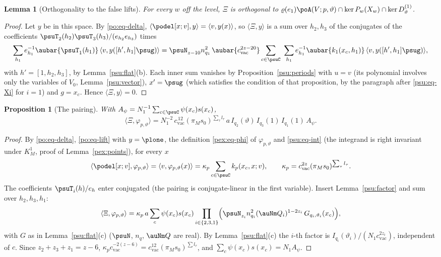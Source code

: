 \documentclass[10pt]{amsart}
\newtheorem{proposition}[theorem]{Proposition}
\newtheorem{lemma}[theorem]{Lemma}
\theoremstyle{definition}
\theoremstyle{remark}
\begin{document}
\begin{lemma}[Orthogonality to the false lifts]\label{psu:orthfalse}
For every $w$ off the level, $\Xi$ is orthogonal to $\varrho(e_1)\poA(V;p,\vartheta)\cap\ker P_w(X_w)
\cap\ker D^{(1)}_\vartheta$.
\end{lemma}
\begin{proof}
Let $y$ be in this space. By \eqref{po:eq-delta}, $\langle\podel[x;v],y\rangle=\langle v,y(x)\rangle$,
so $\langle\Xi,y\rangle$ is a sum over $h_2,h_3$ of the conjugates of the coefficients
$\psuT_2(h_2)\psuT_3(h_3)/(e_{h_2}e_{h_3})$ times
\[
\sum_{h_1}e_{h_1}^{-1}\aubar{\psuT_1(h_1)}\,\langle v,y([h',h_1]\psug)\rangle
=\psuN_{z-10}n_{q_1}^2\,\aubar{c_{\mathrm{vac}}^{2z-20}}\sum_{c\in\psuC}\ \sum_{h_1}e_{h_1}^{-1}
\aubar{k_1(x_c,h_1)}\,\langle v,y([h',h_1]\psug)\rangle ,
\]
with $h'=[1,h_2,h_3]$, by Lemma~\ref{psu:flat}(b). Each inner sum vanishes by
Proposition~\ref{psu:periods} with $u=v$ (its polynomial involves only the variables of $V_0$,
Lemma~\ref{psu:vector}), $x'=\psug$ (which satisfies the condition of that proposition, by the
paragraph after \eqref{psu:eq-Xi} for $i=1$) and $g=x_c$. Hence $\langle\Xi,y\rangle=0$.
\end{proof}

\begin{proposition}[The pairing]\label{psu:pairing}
With $A_\psi=N_1^{-1}\sum_{c\in\psuC}\psi(x_c)s(x_c)$,
\[
\langle\Xi,\varphi_{p,\vartheta}\rangle=N_1^{-2}\,c_{\mathrm{vac}}^{\,12}(\pi_Ms_0)^{\sum_\tau l_\tau}\,a\,
I_{q_2}(\vartheta)\,I_{q_3}(1)\,I_{q_1}(1)\,A_\psi .
\]
\end{proposition}
\begin{proof}
By \eqref{po:eq-delta}, \eqref{po:eq-lift} with $y=\plone$, the definition \eqref{pex:eq-phi} of
$\varphi_{p,\vartheta}$ and \eqref{psu:eq-int} (the integrand is right invariant under $K^1_M$, proof of
Lemma~\ref{pex:points}), for every $x$
\[
\langle\podel[x;v],\varphi_{p,\vartheta}\rangle=\langle v,\varphi_{p,\vartheta}(x)\rangle=\kappa_p\sum_{c\in
\psuC}k_p(x_c,x;v),\qquad\kappa_p=c_{\mathrm{vac}}^{2z}(\pi_Ms_0)^{\sum_\tau l_\tau}.
\]
The coefficients $\psuT_i(h)/e_h$ enter conjugated (the pairing is conjugate-linear in the first
variable). Insert Lemma~\ref{psu:factor} and sum over $h_2,h_3,h_1$:
\[
\langle\Xi,\varphi_{p,\vartheta}\rangle=\kappa_p\,a\sum_c\psi(x_c)s(x_c)\prod_{i\in\{2,3,1\}}\Bigl(
\psuN_{z_i}n_{q_i}^2(\auNm Q_i)^{1-2z_i}\,G_{q_i,\vartheta_i}(x_c)\Bigr),
\]
with $G$ as in Lemma~\ref{psu:flat}(c) ($\psuN$, $n_q$, $\auNm Q$ are real). By Lemma~\ref{psu:flat}(c)
the $i$-th factor is $I_{q_i}(\vartheta_i)/(N_1c_{\mathrm{vac}}^{2z_i})$, independent of $c$. Since
$z_2+z_3+z_1=z-6$, $\kappa_pc_{\mathrm{vac}}^{-2(z-6)}=c_{\mathrm{vac}}^{12}(\pi_Ms_0)^{\sum l_\tau}$, and
$\sum_c\psi(x_c)s(x_c)=N_1A_\psi$.
\end{proof}
\end{document}
